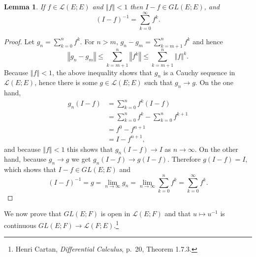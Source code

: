 \documentclass{article}
\newcommand{\norm}[1]{\left\Vert #1 \right\Vert}
\newtheorem{lemma}[theorem]{Lemma}
\theoremstyle{definition}
\begin{document}
\begin{lemma}
If $f \in \mathscr{L}(E;E)$ and $\norm{f}<1$ then $I-f \in GL(E;E)$, and
\[
(I-f)^{-1} = \sum_{k=0}^\infty f^k.
\]
\label{neumann}
\end{lemma}
\begin{proof}
Let 
$g_n=\sum_{k=0}^n f^k$. 
For $n>m$, $g_n-g_m = \sum_{k=m+1}^n f^k$ and hence
\[
\norm{g_n-g_m} \leq \sum_{k=m+1}^n \norm{f^k} 
\leq \sum_{k=m+1}^n \norm{f}^k.
\]
Because $\norm{f}<1$, the above inequality shows that $g_n$ is a Cauchy sequence in $\mathscr{L}(E;E)$,   hence there is some
$g \in \mathscr{L}(E;E)$ such that $g_n \to g$. On the one hand,
\begin{align*}
g_n(I-f) &= \sum_{k=0}^n f^k(I-f)\\
&= \sum_{k=0}^n f^k - \sum_{k=0}^n f^{k+1}\\
&=f^0 - f^{n+1}\\
&=I - f^{n+1},
\end{align*}
and because $\norm{f}<1$ this shows that $g_n(I-f) \to I$ as $n \to \infty$. 
On the other hand, because $g_n \to g$ we get $g_n(I-f) \to g(I-f)$. Therefore
$g(I-f)=I$, which shows that $I-f \in GL(E;E)$ and
\[
(I-f)^{-1}=g=\lim_{n \to \infty} g_n = \lim_{n \to \infty} \sum_{k=0}^n f^k = \sum_{k=0}^\infty f^k.
\]
\end{proof}

We now prove that $GL(E;F)$ is open in $\mathscr{L}(E;F)$ and that
$u \mapsto u^{-1}$ is continuous $GL(E;F) \to \mathscr{L}(F;E)$.\footnote{Henri Cartan, {\em Differential Calculus}, p.~20, Theorem 1.7.3.}
\end{document}
